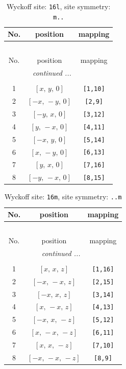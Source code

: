 \documentclass[fleqn,8pt]{jsarticle}
\begin{document}
\begin{longtable}{ccc}
\caption{Wyckoff site: {\tt 16l}, site symmetry: {\tt m..}}
 \\
 \hline \hline
No. & position & mapping \\ \hline \endfirsthead

\multicolumn{2}{l}{\tablename\ \thetable{}} \\
 \hline \hline
No. & position & mapping \\ \hline \endhead

 \hline \hline
\multicolumn{2}{r}{\footnotesize\it continued ...} \\ \endfoot

 \hline \hline
\multicolumn{2}{r}{} \\ \endlastfoot

1 & $\left[ x,\, y,\, 0 \right]$ & {\tt [1,10]} \\ \hline
2 & $\left[ - x,\, - y,\, 0 \right]$ & {\tt [2,9]} \\ \hline
3 & $\left[ - y,\, x,\, 0 \right]$ & {\tt [3,12]} \\ \hline
4 & $\left[ y,\, - x,\, 0 \right]$ & {\tt [4,11]} \\ \hline
5 & $\left[ - x,\, y,\, 0 \right]$ & {\tt [5,14]} \\ \hline
6 & $\left[ x,\, - y,\, 0 \right]$ & {\tt [6,13]} \\ \hline
7 & $\left[ y,\, x,\, 0 \right]$ & {\tt [7,16]} \\ \hline
8 & $\left[ - y,\, - x,\, 0 \right]$ & {\tt [8,15]} \\
\end{longtable}
\renewcommand{\arraystretch}{1.2}
\begin{longtable}{ccc}
\caption{Wyckoff site: {\tt 16m}, site symmetry: {\tt ..m}}
 \\
 \hline \hline
No. & position & mapping \\ \hline \endfirsthead

\multicolumn{2}{l}{\tablename\ \thetable{}} \\
 \hline \hline
No. & position & mapping \\ \hline \endhead

 \hline \hline
\multicolumn{2}{r}{\footnotesize\it continued ...} \\ \endfoot

 \hline \hline
\multicolumn{2}{r}{} \\ \endlastfoot

1 & $\left[ x,\, x,\, z \right]$ & {\tt [1,16]} \\ \hline
2 & $\left[ - x,\, - x,\, z \right]$ & {\tt [2,15]} \\ \hline
3 & $\left[ - x,\, x,\, z \right]$ & {\tt [3,14]} \\ \hline
4 & $\left[ x,\, - x,\, z \right]$ & {\tt [4,13]} \\ \hline
5 & $\left[ - x,\, x,\, - z \right]$ & {\tt [5,12]} \\ \hline
6 & $\left[ x,\, - x,\, - z \right]$ & {\tt [6,11]} \\ \hline
7 & $\left[ x,\, x,\, - z \right]$ & {\tt [7,10]} \\ \hline
8 & $\left[ - x,\, - x,\, - z \right]$ & {\tt [8,9]} \\
\end{longtable}
\end{document}
